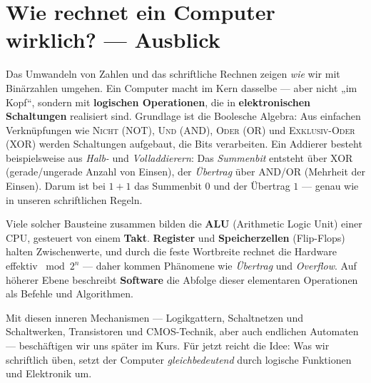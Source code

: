 \documentclass[../skript/main.tex]{subfiles}
\begin{document}
\section*{Wie rechnet ein Computer wirklich? — Ausblick}

Das Umwandeln von Zahlen und das schriftliche Rechnen zeigen \emph{wie} wir mit Binärzahlen umgehen. Ein Computer macht im Kern dasselbe — aber nicht „im Kopf“, sondern mit \textbf{logischen Operationen}, die in \textbf{elektronischen Schaltungen} realisiert sind. Grundlage ist die Boolesche Algebra: Aus einfachen Verknüpfungen wie \textsc{Nicht} (NOT), \textsc{Und} (AND), \textsc{Oder} (OR) und \textsc{Exklusiv-Oder} (XOR) werden Schaltungen aufgebaut, die Bits verarbeiten. Ein Addierer besteht beispielsweise aus \emph{Halb-} und \emph{Volladdierern}: Das \emph{Summenbit} entsteht über XOR (gerade/ungerade Anzahl von Einsen), der \emph{Übertrag} über AND/OR (Mehrheit der Einsen). Darum ist bei \(1+1\) das Summenbit \(0\) und der Übertrag \(1\) — genau wie in unseren schriftlichen Regeln.

Viele solcher Bausteine zusammen bilden die \textbf{ALU} (Arithmetic Logic Unit) einer CPU, gesteuert von einem \textbf{Takt}. \textbf{Register} und \textbf{Speicherzellen} (Flip-Flops) halten Zwischenwerte, und durch die feste Wortbreite rechnet die Hardware effektiv \(\bmod 2^n\) — daher kommen Phänomene wie \emph{Übertrag} und \emph{Overflow}. Auf höherer Ebene beschreibt \textbf{Software} die Abfolge dieser elementaren Operationen als Befehle und Algorithmen.

Mit diesen inneren Mechanismen — Logikgattern, Schaltnetzen und Schaltwerken, Transistoren und CMOS-Technik, aber auch endlichen Automaten — beschäftigen wir uns später im Kurs. Für jetzt reicht die Idee: Was wir schriftlich üben, setzt der Computer \emph{gleichbedeutend} durch logische Funktionen und Elektronik um.
\end{document}
